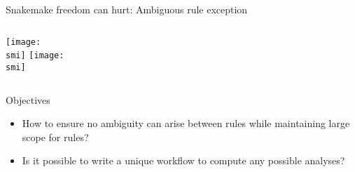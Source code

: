 \documentclass[10pt, usenames, dvipsnames]{beamer}
\def\smi{out/ln/updir/mw-gcthesis-oral/library.bib}
\begin{document}
\begin{frame}{Snakemake freedom can hurt: Ambiguous rule exception}
  \begin{columns}
    \def\smi{out/ln/updir/mw-gcthesis-oral/ink/snakemake/ambiguous_rules.pdf}
    \texttt{[image: \\smi]}%
    \def\smi{out/graphviz/dot_-Tpdf/ln/updir/mw-gcthesis-oral/dot/wget_gzip.pdf}
    \texttt{[image: \\smi]}
  \end{columns}
\end{frame}
\begin{frame}{Objectives}
  \begin{itemize}
    \item How to ensure no ambiguity can arise between rules while maintaining large scope for rules?
    \item Is it possible to write a unique workflow to compute any possible analyses?
  \end{itemize}
\end{frame}
\end{document}

